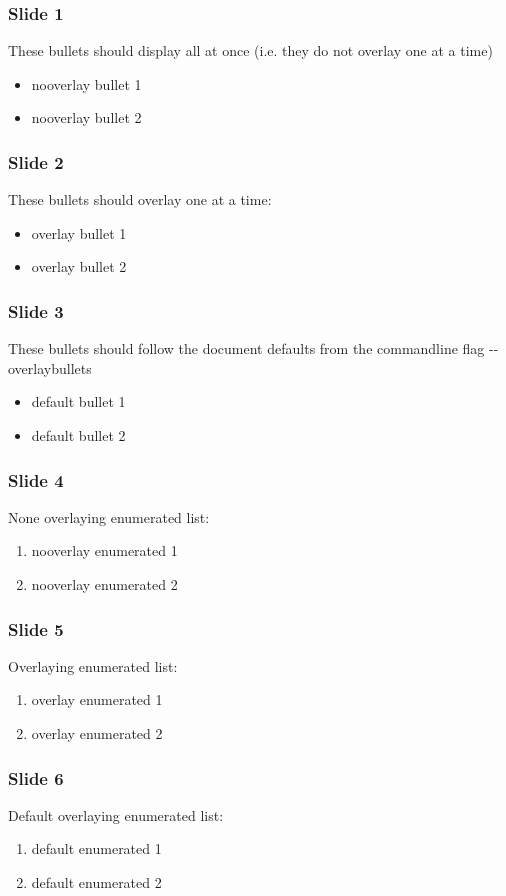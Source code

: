 \documentclass[t,english]{beamer}
\begin{document}
\begin{frame}[fragile]
\frametitle{Slide 1}


These bullets should display all at once (i.e. they do not overlay one
at a time)
\begin{itemize}

\item nooverlay bullet 1

\item nooverlay bullet 2
\end{itemize}
\end{frame}

\begin{frame}[fragile]
\frametitle{Slide 2}


These bullets should overlay one at a time:
\begin{itemize}[<+-| alert@+>]

\item overlay bullet 1

\item overlay bullet 2
\end{itemize}
\end{frame}

\begin{frame}[fragile]
\frametitle{Slide 3}


These bullets should follow the document defaults from the commandline
flag -{}-overlaybullets
\begin{itemize}[<+-| alert@+>]

\item default bullet 1

\item default bullet 2
\end{itemize}
\end{frame}

\begin{frame}[fragile]
\frametitle{Slide 4}


None overlaying enumerated list:
\begin{enumerate}

\item nooverlay enumerated 1

\item nooverlay enumerated 2
\end{enumerate}
\end{frame}

\begin{frame}[fragile]
\frametitle{Slide 5}


Overlaying enumerated list:
\begin{enumerate}[<+-| alert@+>]

\item overlay enumerated 1

\item overlay enumerated 2
\end{enumerate}
\end{frame}

\begin{frame}[fragile]
\frametitle{Slide 6}


Default overlaying enumerated list:
\begin{enumerate}[<+-| alert@+>]

\item default enumerated 1

\item default enumerated 2
\end{enumerate}
\end{frame}
\end{document}
